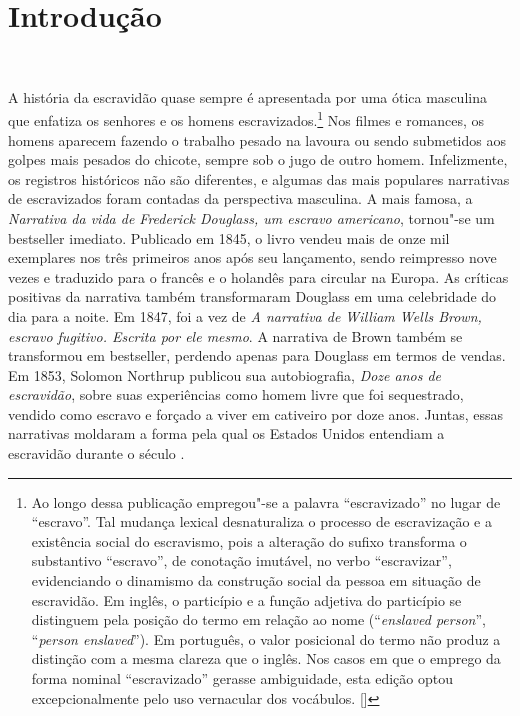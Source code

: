 \chapter*{Introdução} %

\begin{flushright}
\\\vspace{-3pt}
\end{flushright}

A história da escravidão quase sempre é apresentada por uma ótica
masculina que enfatiza os senhores e os homens escravizados.\footnote{Ao longo dessa publicação empregou"-se a palavra ``escravizado'' no lugar de ``escravo''. Tal mudança lexical desnaturaliza o processo de escravização e a existência social do escravismo, pois a alteração do sufixo transforma o substantivo ``escravo'', de conotação imutável, no verbo ``escravizar'', evidenciando o dinamismo da construção social da pessoa em situação de escravidão. Em inglês, o particípio e a função adjetiva do particípio se distinguem pela posição do termo em relação ao nome (``\emph{enslaved person}'', ``\emph{person enslaved}''). Em português, o valor posicional do termo não produz a distinção com a mesma clareza que o inglês. Nos casos em que o emprego da forma nominal ``escravizado'' gerasse ambiguidade, esta edição optou excepcionalmente pelo uso vernacular dos vocábulos. []} Nos filmes
e romances, os homens aparecem fazendo o trabalho pesado na lavoura ou
sendo submetidos aos golpes mais pesados do chicote, sempre sob o jugo
de outro homem. Infelizmente, os registros históricos não são
diferentes, e algumas das mais populares narrativas de escravizados foram
contadas da perspectiva masculina. A mais famosa, a \emph{Narrativa da
vida de Frederick Douglass, um escravo americano}, tornou"-se um
bestseller imediato. Publicado em 1845, o livro vendeu mais de onze mil
exemplares nos três primeiros anos após seu lançamento, sendo reimpresso
nove vezes e traduzido para o francês e o holandês para circular na
Europa. As críticas positivas da narrativa também transformaram Douglass
em uma celebridade do dia para a noite. Em 1847, foi a vez de \emph{A
narrativa de William Wells Brown, escravo fugitivo. Escrita por ele mesmo}. A narrativa de Brown também se transformou em bestseller,
perdendo apenas para Douglass em termos de vendas. Em 1853, Solomon
Northrup publicou sua autobiografia, \emph{Doze anos de escravidão},
sobre suas experiências como homem livre que foi sequestrado, vendido
como escravo e forçado a viver em cativeiro por doze anos. Juntas, essas
narrativas moldaram a forma pela qual os Estados Unidos entendiam a escravidão
durante o século .

